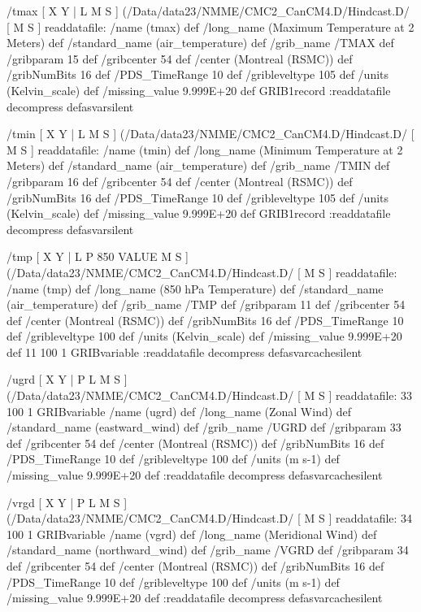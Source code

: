 \begin{ingrid}
/tmax {
[ X Y | L M S ] (/Data/data23/NMME/CMC2_CanCM4.D/Hindcast.D/%
[ M S ]
readdatafile: 
/name (tmax) def
/long_name (Maximum Temperature at 2 Meters) def
/standard_name (air_temperature) def
/grib_name /TMAX def
/gribparam 15 def
/gribcenter 54 def
/center (Montreal (RSMC)) def
/gribNumBits 16 def
/PDS_TimeRange 10 def
/gribleveltype 105 def
/units (Kelvin_scale) def
/missing_value 9.999E+20 def
GRIB1record
:readdatafile decompress
} defasvarsilent

/tmin {
[ X Y | L M S ] (/Data/data23/NMME/CMC2_CanCM4.D/Hindcast.D/%
[ M S ]
readdatafile: 
/name (tmin) def
/long_name (Minimum Temperature at 2 Meters) def
/standard_name (air_temperature) def
/grib_name /TMIN def
/gribparam 16 def
/gribcenter 54 def
/center (Montreal (RSMC)) def
/gribNumBits 16 def
/PDS_TimeRange 10 def
/gribleveltype 105 def
/units (Kelvin_scale) def
/missing_value 9.999E+20 def
GRIB1record
:readdatafile decompress
} defasvarsilent

/tmp {
[ X Y | L P 850 VALUE M S ]
(/Data/data23/NMME/CMC2_CanCM4.D/Hindcast.D/%
[ M S ]
readdatafile: 
/name (tmp) def
/long_name (850 hPa Temperature) def
/standard_name (air_temperature) def
/grib_name /TMP def
/gribparam 11 def
/gribcenter 54 def
/center (Montreal (RSMC)) def
/gribNumBits 16 def
/PDS_TimeRange 10 def
/gribleveltype 100 def
/units (Kelvin_scale) def
/missing_value 9.999E+20 def
11 100 1 GRIBvariable
:readdatafile decompress
} defasvarcachesilent

/ugrd {
[ X Y | P L M S ]
(/Data/data23/NMME/CMC2_CanCM4.D/Hindcast.D/%
[ M S ]
readdatafile:
33 100 1 GRIBvariable 
/name (ugrd) def
/long_name (Zonal Wind) def
/standard_name (eastward_wind) def
/grib_name /UGRD def
/gribparam 33 def
/gribcenter 54 def
/center (Montreal (RSMC)) def
/gribNumBits 16 def
/PDS_TimeRange 10 def
/gribleveltype 100 def
/units (m s-1) def
/missing_value 9.999E+20 def
:readdatafile decompress
} defasvarcachesilent

/vrgd {
[ X Y | P L M S ]
(/Data/data23/NMME/CMC2_CanCM4.D/Hindcast.D/%
[ M S ]
readdatafile:
34 100 1 GRIBvariable 
/name (vgrd) def
/long_name (Meridional Wind) def
/standard_name (northward_wind) def
/grib_name /VGRD def
/gribparam 34 def
/gribcenter 54 def
/center (Montreal (RSMC)) def
/gribNumBits 16 def
/PDS_TimeRange 10 def
/gribleveltype 100 def
/units (m s-1) def
/missing_value 9.999E+20 def
:readdatafile decompress
} defasvarcachesilent


\end{ingrid}
